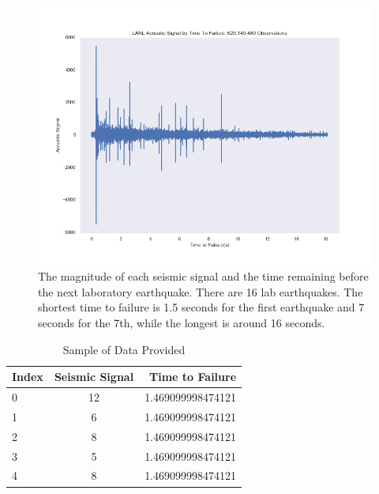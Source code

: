 \documentclass[]{llncs} %
\begin{document}
\begin{figure}[h]
	\centering
	\includegraphics[width=1\linewidth]{../GPUProject/allDataDefaultPlot}
	\caption{The magnitude of each seismic signal and the time remaining before the next laboratory earthquake. There are 16 lab earthquakes. The shortest time to failure is 1.5 seconds for the first earthquake and 7 seconds for the 7th, while the longest is around 16 seconds.}
	\label{fig:alldatadefaultplot}
\end{figure}
\begin{table}[h!]
	\begin{center}
		\caption{Sample of Data Provided}
		\label{tab:table1}
		\begin{tabular}{l|c|r} 
			\textbf{Index} & \textbf{Seismic Signal} & \textbf{Time to Failure}\\
			\hline
			0 & 12 & 1.469099998474121 \\ 
			1 & 6 & 1.469099998474121 \\ 
			2 & 8 & 1.469099998474121 \\ 
			3 & 5 & 1.469099998474121 \\ 
			4 & 8 & 1.469099998474121 \\ 
		\end{tabular}
	\end{center}
\end{table}
\end{document}
